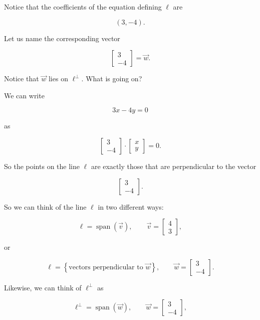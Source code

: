 Notice that the coefficients of the equation defining $\ell$ are

$$
(3,-4).
$$

Let us name the corresponding vector

$$
\begin{bmatrix}
3\\
-4
\end{bmatrix}
=
\vec w.
$$

Notice that $\vec w $
lies on $\ell^\perp$.
What is going on?

We can write

$$
3x-4y=0
$$

as

$$
\begin{bmatrix}
3\\
-4
\end{bmatrix}
\cdot
\begin{bmatrix}
x\\
y
\end{bmatrix}
=0.
$$

So the points on the line $\ell$ are exactly those that are perpendicular to
the vector

$$
\begin{bmatrix}
3\\
-4
\end{bmatrix}.
$$


So we can think of the line $\ell$ in two different ways:

$$
\ell
=
\operatorname{span}(\vec v),
\qquad
\vec v=
\begin{bmatrix}
4\\
3
\end{bmatrix},
$$

or

$$
\ell
=
\left\{
\text{vectors perpendicular to } \vec w
\right\},
\qquad
\vec w=
\begin{bmatrix}
3\\
-4
\end{bmatrix}.
$$

Likewise, we can think of $\ell^\perp$ as

$$
\ell^\perp
=
\operatorname{span}(\vec w),
\qquad
\vec w=
\begin{bmatrix}
3\\
-4
\end{bmatrix},
$$


